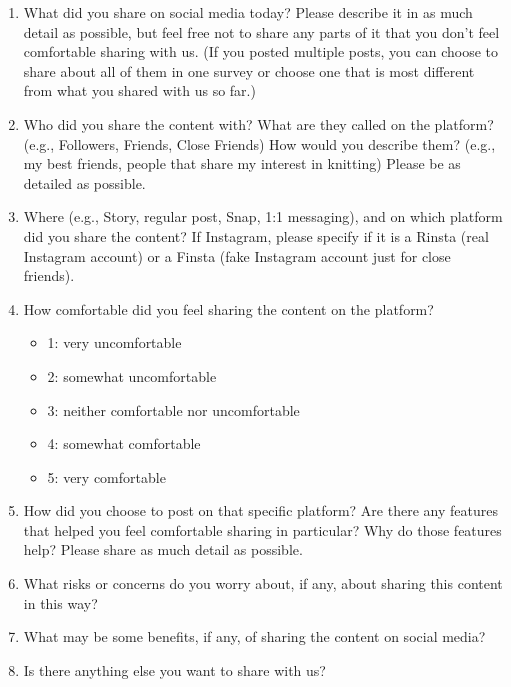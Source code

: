 \begin{enumerate}
    \item What did you share on social media today? Please describe it in as much detail as possible, but feel free not to share any parts of it that you don’t feel comfortable sharing with us. (If you posted multiple posts, you can choose to share about all of them in one survey or choose one that is most different from what you shared with us so far.)

    \item Who did you share the content with? What are they called on the platform? (e.g., Followers, Friends, Close Friends) How would you describe them? (e.g., my best friends, people that share my interest in knitting) Please be as detailed as possible.

    \item Where (e.g., Story, regular post, Snap, 1:1 messaging), and on which platform did you share the content? If Instagram, please specify if it is a Rinsta (real Instagram account) or a Finsta (fake Instagram account just for close friends).

    \item How comfortable did you feel sharing the content on the platform?
    \begin{itemize}
        \item 1: very uncomfortable
        \item 2: somewhat uncomfortable
        \item 3: neither comfortable nor uncomfortable
        \item 4: somewhat comfortable
        \item 5: very comfortable
    \end{itemize}

    \item How did you choose to post on that specific platform? Are there any features that helped you feel comfortable sharing in particular? Why do those features help? Please share as much detail as possible.

    \item What risks or concerns do you worry about, if any, about sharing this content in this way?

    \item What may be some benefits, if any, of sharing the content on social media?

    \item Is there anything else you want to share with us?
\end{enumerate}

